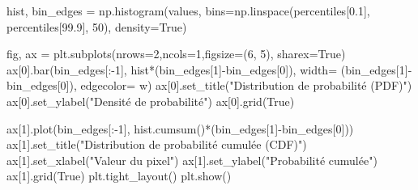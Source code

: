 \documentclass[
]{article}
\newenvironment{Shaded}{}{}
\newcommand{\DecValTok}[1]{\textcolor[rgb]{0.25,0.63,0.44}{#1}}
\newcommand{\FloatTok}[1]{\textcolor[rgb]{0.25,0.63,0.44}{#1}}
\newcommand{\NormalTok}[1]{#1}
\newcommand{\OperatorTok}[1]{\textcolor[rgb]{0.40,0.40,0.40}{#1}}
\newcommand{\StringTok}[1]{\textcolor[rgb]{0.25,0.44,0.63}{#1}}
\newcommand{\VariableTok}[1]{\textcolor[rgb]{0.10,0.09,0.49}{#1}}
\begin{document}
\label{fa0a89f0}
\label{cb22}
\begin{Shaded}
\begin{Highlighting}[]
\NormalTok{hist, bin\_edges }\OperatorTok{=}\NormalTok{ np.histogram(values, }
\NormalTok{                                bins}\OperatorTok{=}\NormalTok{np.linspace(percentiles[}\FloatTok{0.1}\NormalTok{], }
\NormalTok{                                percentiles[}\FloatTok{99.9}\NormalTok{], }\DecValTok{50}\NormalTok{), }
\NormalTok{                                density}\OperatorTok{=}\VariableTok{True}\NormalTok{)}

\NormalTok{fig, ax }\OperatorTok{=}\NormalTok{ plt.subplots(nrows}\OperatorTok{=}\DecValTok{2}\NormalTok{,ncols}\OperatorTok{=}\DecValTok{1}\NormalTok{,figsize}\OperatorTok{=}\NormalTok{(}\DecValTok{6}\NormalTok{, }\DecValTok{5}\NormalTok{), sharex}\OperatorTok{=}\VariableTok{True}\NormalTok{)}
\NormalTok{ax[}\DecValTok{0}\NormalTok{].bar(bin\_edges[:}\OperatorTok{{-}}\DecValTok{1}\NormalTok{], }
\NormalTok{                hist}\OperatorTok{*}\NormalTok{(bin\_edges[}\DecValTok{1}\NormalTok{]}\OperatorTok{{-}}\NormalTok{bin\_edges[}\DecValTok{0}\NormalTok{]), }
\NormalTok{                width}\OperatorTok{=}\NormalTok{ (bin\_edges[}\DecValTok{1}\NormalTok{]}\OperatorTok{{-}}\NormalTok{bin\_edges[}\DecValTok{0}\NormalTok{]), }
\NormalTok{                edgecolor}\OperatorTok{=} \StringTok{\textquotesingle{}w\textquotesingle{}}\NormalTok{)}
\NormalTok{ax[}\DecValTok{0}\NormalTok{].set\_title(}\StringTok{"Distribution de probabilité (PDF)"}\NormalTok{)}
\NormalTok{ax[}\DecValTok{0}\NormalTok{].set\_ylabel(}\StringTok{"Densité de probabilité"}\NormalTok{)}
\NormalTok{ax[}\DecValTok{0}\NormalTok{].grid(}\VariableTok{True}\NormalTok{)}

\NormalTok{ax[}\DecValTok{1}\NormalTok{].plot(bin\_edges[:}\OperatorTok{{-}}\DecValTok{1}\NormalTok{], }
\NormalTok{            hist.cumsum()}\OperatorTok{*}\NormalTok{(bin\_edges[}\DecValTok{1}\NormalTok{]}\OperatorTok{{-}}\NormalTok{bin\_edges[}\DecValTok{0}\NormalTok{]))}
\NormalTok{ax[}\DecValTok{1}\NormalTok{].set\_title(}\StringTok{"Distribution de probabilité cumulée (CDF)"}\NormalTok{)}
\NormalTok{ax[}\DecValTok{1}\NormalTok{].set\_xlabel(}\StringTok{"Valeur du pixel"}\NormalTok{)}
\NormalTok{ax[}\DecValTok{1}\NormalTok{].set\_ylabel(}\StringTok{"Probabilité cumulée"}\NormalTok{)}
\NormalTok{ax[}\DecValTok{1}\NormalTok{].grid(}\VariableTok{True}\NormalTok{)}
\NormalTok{plt.tight\_layout()}
\NormalTok{plt.show()                              }
\end{Highlighting}
\end{Shaded}
\end{document}

